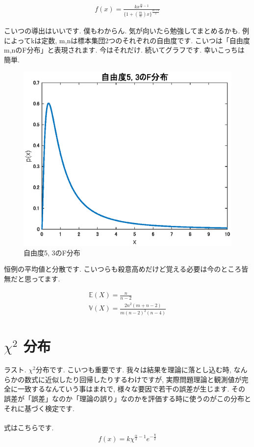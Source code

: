 \documentclass[11pt,a4paper,uplatex]{ujreport} 	%
\begin{document}
\begin{align}
f(x) = \frac{kx^{\frac{m}{2}-1}}{\{1 + (\frac{m}{n})x\}^{\frac{m+n}{2}}}
\end{align}

こいつの導出はいいです. 僕もわからん. 気が向いたら勉強してまとめるかも. 例によってkは定数, m,nは標本集団2つのそれぞれの自由度です. こいつは「自由度m,nのF分布」と表現されます. 今はそれだけ. 続いてグラフです. 幸いこっちは簡単.

\begin{figure}[H]
\label{im:f_dist}
  \centering
  \includegraphics[width=120mm]{../figures/f_dist.eps}
  \caption{自由度5, 3のF分布}
\end{figure}

恒例の平均値と分散です. こいつらも殺意高めだけど覚える必要は今のところ皆無だと思ってます.

\begin{align}
\mathbb{E}(X) = \frac{n}{n-2}\\
\mathbb{V}(X) = \frac{2n^2 (m+n-2)}{m(n-2)^2(n-4)}
\end{align}

\section{$\chi^2$ 分布}

ラスト. $\chi^2$分布です. こいつも重要です. 我々は結果を理論に落とし込む時, なんらかの数式に近似したり回帰したりするわけですが, 実際問題理論と観測値が完全に一致するなんていう事はまれで, 様々な要因で若干の誤差が生じます. その誤差が「誤差」なのか「理論の誤り」なのかを評価する時に使うのがこの分布とそれに基づく検定です. \\
\\
式はこちらです. 
\begin{align}
f(x) = k\chi^{\frac{\alpha}{2}-1}e^{-\frac{\chi}{2}}
\end{align}
\end{document}
